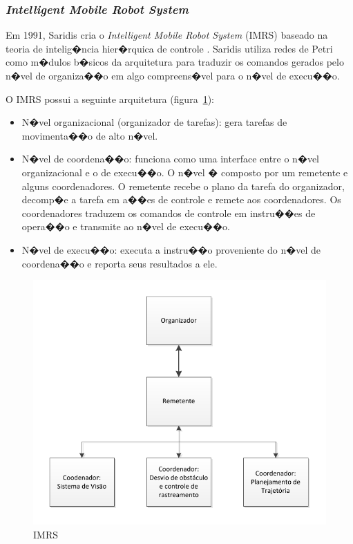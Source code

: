 \subsubsection{\textit{Intelligent Mobile Robot System}}
Em 1991, Saridis \cite{wang1991petri} cria o \emph{Intelligent Mobile
Robot System} (IMRS) baseado na teoria de intelig�ncia hier�rquica de controle
\cite{saridis1988analytical}. Saridis utiliza redes de Petri como m�dulos
b�sicos da arquitetura para traduzir os comandos gerados pelo n�vel de
organiza��o em algo compreens�vel para o n�vel de execu��o.

O IMRS possui a seguinte arquitetura (figura~\ref{Saridis_1}):
\begin{itemize}
  \item N�vel organizacional (organizador de tarefas): gera tarefas de
  movimenta��o de alto n�vel.
  \item N�vel de coordena��o: funciona como uma interface entre o n�vel
  organizacional e o de execu��o. O n�vel � composto por um remetente e alguns
  coordenadores. O remetente recebe o plano da tarefa do organizador, decomp�e a
  tarefa em a��es de controle e remete aos coordenadores. Os coordenadores
  traduzem os comandos de controle em instru��es de opera��o e transmite ao
  n�vel de execu��o.
  \item N�vel de execu��o: executa a instru��o proveniente do n�vel de
  coordena��o e reporta seus resultados a ele.
\end{itemize}

\begin{figure}[H]
\centering
\includegraphics[width=1\columnwidth]{figs/SARIDIS_1.pdf}
\caption{IMRS}
\label{Saridis_1} 
\end{figure}

